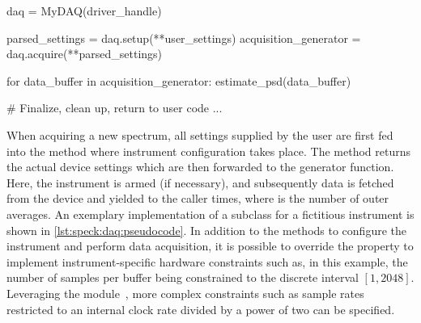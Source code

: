 \begin{listing}[htpb]
    \begin{pycode}
        daq = MyDAQ(driver_handle)

        parsed_settings = daq.setup(**user_settings)
        acquisition_generator = daq.acquire(**parsed_settings)

        for data_buffer in acquisition_generator:
            estimate_psd(data_buffer)

        # Finalize, clean up, return to user code
        ...
    \end{pycode}
    \caption{
        \gls{daq} workflow pseudocode.
        A  object (representing the instrument ) is instantiated with a driver object (for instance a \href{https://github.com/microsoft/qcodes}{\qcodes} ).
        The instrument is configured with the given .
        Calling the generator function  with the actual device settings returns a generator, iterating over which yields one data buffer per iteration.
        The data buffers can then be passed to further processing functions (the \gls{psd} estimator in our example).
    }
    \label{lst:speck:daq:workflow}
\end{listing}

When acquiring a new spectrum, all settings supplied by the user are first fed into the  method where instrument configuration takes place.
The method returns the actual device settings which are then forwarded to the  generator function.
Here, the instrument is armed (if necessary), and subsequently data is fetched from the device and yielded to the caller  times, where  is the number of outer averages.
An exemplary implementation of a  subclass for a fictitious instrument is shown in \cref{lst:speck:daq:pseudocode}.
In addition to the methods to configure the instrument and perform data acquisition, it is possible to override the  property to implement instrument-specific hardware constraints such as, in this example, the number of samples per buffer being constrained to the discrete interval $[1, 2048]$.
Leveraging the  module~\cite{Hangleiter_qutil}, more complex constraints such as sample rates restricted to an internal clock rate divided by a power of two
can be specified.

